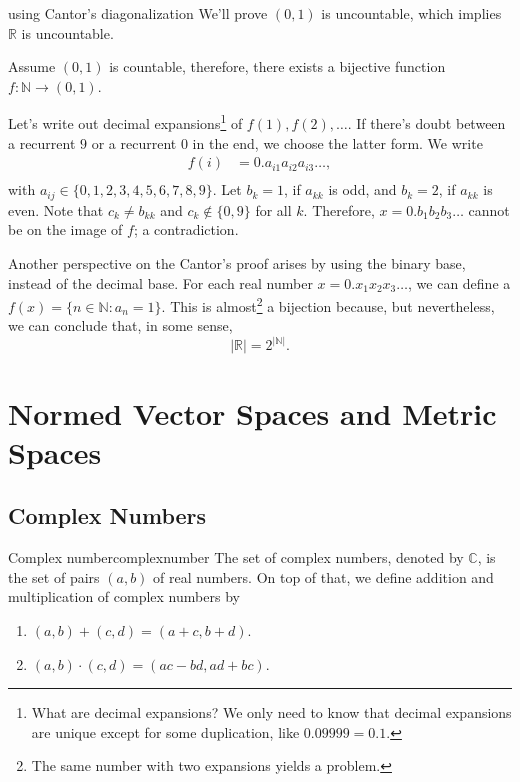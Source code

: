 
\begin{dem}{using Cantor's diagonalization}{}
	We'll prove \((0, 1)\) is uncountable, which implies \(\mathbb{R}\) is uncountable.

	Assume \((0, 1)\) is countable, therefore, there exists a bijective function \(f: \mathbb{N} \to (0, 1)\).

	Let's write out decimal expansions\footnote{What are decimal expansions? We only need to know that decimal expansions are unique except for some duplication, like \(0.09999 = 0.1\).} of \(f(1), f(2), \dots\). If there's doubt between a recurrent \(9\) or a recurrent \(0\) in the end, we choose the latter form. We write
	\begin{align*}
		f(i) &= 0.a_{i1}a_{i2}a_{i3}\dots,\\
	\end{align*}
	with \(a_{ij} \in \{0, 1, 2, 3, 4, 5, 6, 7, 8, 9\}\).
	Let \(b_k = 1\), if \(a_{kk}\) is odd, and \(b_k = 2\), if \(a_{kk}\) is even. Note that \(c_{k} \neq b_{kk}\) and \(c_{k} \notin \{0, 9\}\) for all \(k\).
	Therefore, \(x = 0.b_1b_2b_3\dots\) cannot be on the image of \(f\); a contradiction.
\end{dem}

Another perspective on the Cantor's proof arises by using the binary base, instead of the decimal base. For each real number \(x = 0.x_1x_2x_3\dots\), we can define a \(f(x) = \{n \in \mathbb{N} : a_n = 1\}\). This is almost\footnote{The same number with two expansions yields a problem.} a bijection because, but nevertheless, we can conclude that, in some sense, \[
		|\mathbb{R}| = 2^{|\mathbb{N}|}.
\]

\chapter{Normed Vector Spaces and Metric Spaces}

\section{Complex Numbers}

\begin{defn}{Complex number}{complexnumber}
	The set of complex numbers, denoted by \(\mathbb{C}\), is the set of pairs \((a, b)\) of real numbers. On top of that, we define addition and multiplication of complex numbers by
	\begin{enumerate}[label = \textbullet]
		\item \((a, b) + (c, d) = (a + c, b + d)\).
		\item \((a, b) \cdot (c, d) = (ac - bd, ad + bc)\).
	\end{enumerate}
\end{defn}

